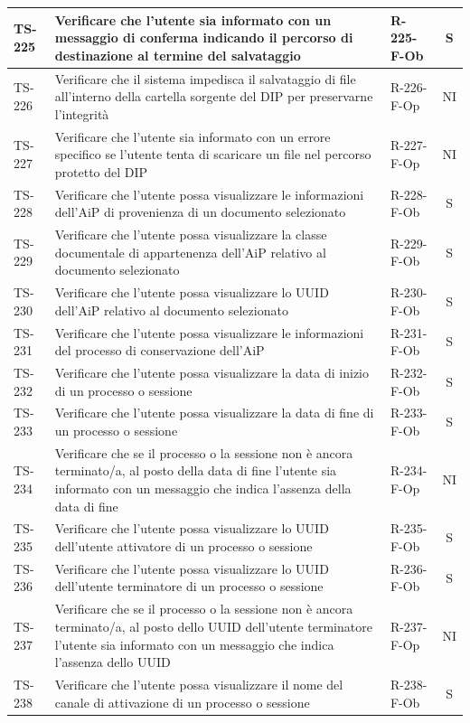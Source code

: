 \documentclass[a4paper,12pt]{article}
\begin{document}
\begin{longtable}{|p{1.5cm}|p{8.3cm}|p{2.4cm}|c|}
\hline
TS-225 & Verificare che l'utente sia informato con un messaggio di conferma indicando il percorso di destinazione al termine del salvataggio & R-225-F-Ob & S \\
\hline
TS-226 & Verificare che il sistema impedisca il salvataggio di file all'interno della cartella sorgente del DIP per preservarne l'integrità & R-226-F-Op & NI \\
\hline
TS-227 & Verificare che l'utente sia informato con un errore specifico se l'utente tenta di scaricare un file nel percorso protetto del DIP & R-227-F-Op & NI \\
\hline
TS-228 & Verificare che l'utente possa visualizzare le informazioni dell'AiP di provenienza di un documento selezionato & R-228-F-Ob & S \\
\hline
TS-229 & Verificare che l'utente possa visualizzare la classe documentale di appartenenza dell'AiP relativo al documento selezionato & R-229-F-Ob & S \\
\hline
TS-230 & Verificare che l'utente possa visualizzare lo UUID dell'AiP relativo al documento selezionato & R-230-F-Ob & S \\
\hline
TS-231 & Verificare che l'utente possa visualizzare le informazioni del processo di conservazione dell'AiP & R-231-F-Ob & S \\
\hline
TS-232 & Verificare che l'utente possa visualizzare la data di inizio di un processo o sessione & R-232-F-Ob & S \\
\hline
TS-233 & Verificare che l'utente possa visualizzare la data di fine di un processo o sessione & R-233-F-Ob & S \\
\hline
TS-234 & Verificare che se il processo o la sessione non è ancora terminato/a, al posto della data di fine l'utente sia informato con un messaggio che indica l'assenza della data di fine & R-234-F-Op & NI \\
\hline
TS-235 & Verificare che l'utente possa visualizzare lo UUID dell'utente attivatore di un processo o sessione & R-235-F-Ob & S \\
\hline
TS-236 & Verificare che l'utente possa visualizzare lo UUID dell'utente terminatore di un processo o sessione & R-236-F-Ob & S \\
\hline
TS-237 & Verificare che se il processo o la sessione non è ancora terminato/a, al posto dello UUID dell'utente terminatore l'utente sia informato con un messaggio che indica l'assenza dello UUID & R-237-F-Op & NI \\
\hline
TS-238 & Verificare che l'utente possa visualizzare il nome del canale di attivazione di un processo o sessione & R-238-F-Ob & S \\

\end{longtable}
\end{document}
